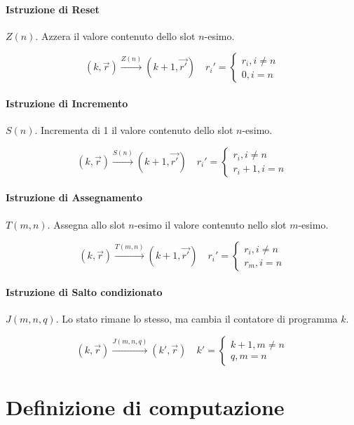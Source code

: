 	\paragraph{Istruzione di Reset} $Z(n)$. Azzera il valore contenuto dello slot $n$-esimo. 
	
	$$
	(k, \vec{r}) \xrightarrow{Z(n)} (k+1, \vec{r'}) \quad r_i' = \begin{cases}
	r_i, i \neq n\\
	0, i = n
	\end{cases}
	$$
	
	\paragraph{Istruzione di Incremento} $S(n)$. Incrementa di 1 il valore contenuto dello slot $n$-esimo. 
	
	$$
	(k, \vec{r}) \xrightarrow{S(n)} (k+1, \vec{r'}) \quad r_i' = \begin{cases}
	r_i, i \neq n\\
	r_i +1, i = n \end{cases}
	$$
	
	\paragraph{Istruzione di Assegnamento} $T(m,n)$. Assegna allo slot $n$-esimo il valore contenuto nello slot $m$-esimo. 
	
	$$
	(k, \vec{r}) \xrightarrow{T(m, n)} (k+1, \vec{r'}) \quad r_i' = \begin{cases}
		r_i, i \neq n\\
		r_m, i = n \end{cases}
	$$
	
	\paragraph{Istruzione di Salto condizionato} $J(m,n, q)$. Lo stato rimane lo stesso, ma cambia il contatore di programma $k$.
	
	$$
	(k, \vec{r}) \xrightarrow{J(m, n, q)} (k', \vec{r}) \quad k' = \begin{cases}
		k+1, m \neq n\\
		q, m = n \end{cases}
	$$
	
	
	\section{Definizione di computazione}
	

